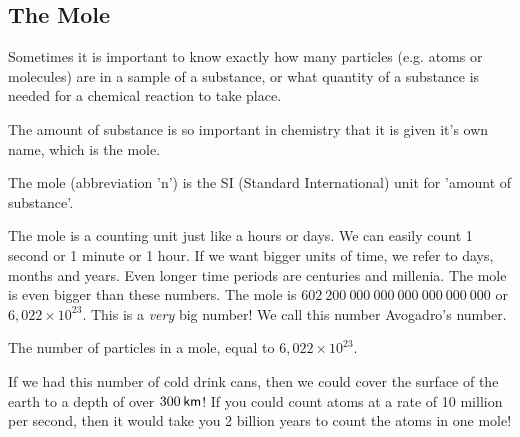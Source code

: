             \subsection*{The Mole}
            \nopagebreak
      \label{m38717*id275573}Sometimes it is important to know exactly how many particles (e.g. atoms or molecules) are in a sample of a substance, or what quantity of a substance is needed for a chemical reaction to take place.\par 
\label{m38717*eip-872}The amount of substance is so important in chemistry that it is given it's own name, which is the mole.  \par \label{m38717*fhsst!!!underscore!!!id119}
 { \label{m38717*meaningfhsst!!!underscore!!!id119}
      \label{m38717*id275969}The mole (abbreviation 'n') is the SI (Standard International) unit for 'amount of substance'. \par 
       } 
The mole is a counting unit just like a hours or days. We can easily count 1 second or 1 minute or 1 hour. If we want bigger units of time, we refer to days, months and years. Even longer time periods are centuries and millenia. The mole is even bigger than these numbers. The mole is $602 ~200 ~000 ~000 ~000 ~000 ~000 ~000$ or $6,022 \times 10^{23}$. This is a \textsl{very} big number! We call this number Avogadro's number. \label{m38717*fhsst!!!underscore!!!id123}
 { \label{m38717*meaningfhsst!!!underscore!!!id123}
      \label{m38717*id276010}The number of particles in a mole, equal to $6,022\ensuremath{\times}{10}^{23}$. \par 
       } 
\label{m38717*eip-446}If we had this number of cold drink cans, then we could cover the surface of the earth to a depth of over $300\phantom{\rule{2pt}{0ex}}\mathsf{km}$! If you could count atoms at a rate of 10 million per second, then it would take you 2 billion years to count the atoms in one mole!\par \label{m38717*notfhsst!!!underscore!!!id126}
